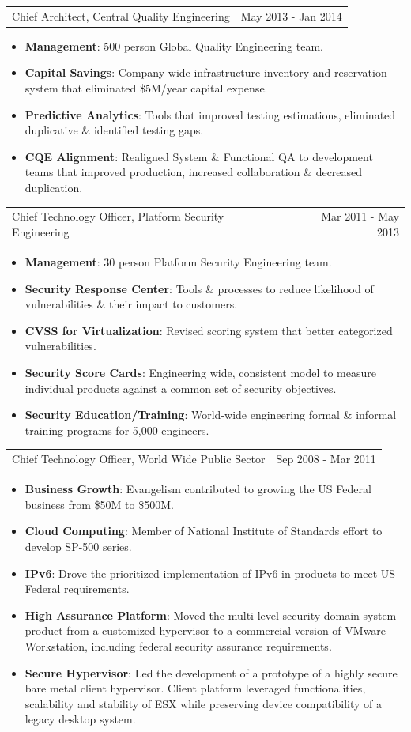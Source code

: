 \documentclass[letterpaper,11pt]{article}
\makeatletter
\newcommand{\resumeCompanyPositionHeading}[2]{
      \item
      \begin{tabular*}{1.0\textwidth}{l@{\extracolsep{\fill}}r}
        {#1} & {#2}
    \end{tabular*}\vspace{-10pt}
}
\newcommand{\resumeItem}[2]{\item{{\textbf{\small#1}}: {\small#2 \vspace{-1pt}}}}
\newcommand{\resumeItemListStart}{\begin{itemize}}
\newcommand{\resumeItemListEnd}{\end{itemize}}\vspace{-10pt}
\makeatother
\begin{document}
          \resumeCompanyPositionHeading
            {Chief Architect, Central Quality Engineering}
            {May 2013 - Jan 2014}
            \resumeItemListStart
                \resumeItem{Management}{500 person Global Quality Engineering team.}
                \resumeItem{Capital Savings}{Company wide infrastructure inventory and reservation system that eliminated \$5M/year capital expense.}
                \resumeItem{Predictive Analytics}{Tools that improved testing estimations, eliminated duplicative \& identified testing gaps.}
                \resumeItem{CQE Alignment}{Realigned System \& Functional QA to development teams that improved production, increased collaboration \& decreased duplication.}
            \resumeItemListEnd

          \resumeCompanyPositionHeading
            {Chief Technology Officer, Platform Security Engineering}
            {Mar 2011 - May 2013}
            \resumeItemListStart
                \resumeItem{Management}{30 person Platform Security Engineering team.}
                \resumeItem{Security Response Center}{Tools \& processes to reduce likelihood of vulnerabilities \& their impact to customers.}
                \resumeItem{CVSS for Virtualization}{Revised scoring system that better categorized vulnerabilities.}
                \resumeItem{Security Score Cards}{Engineering wide, consistent model to measure individual products against a common set of security objectives.}
                \resumeItem{Security Education/Training}{World-wide engineering formal \& informal training programs for 5,000 engineers.}
            \resumeItemListEnd

          \resumeCompanyPositionHeading
            {Chief Technology Officer, World Wide Public Sector}
            {Sep 2008 - Mar 2011}
            \resumeItemListStart
                \resumeItem{Business Growth}{Evangelism contributed to growing the US Federal business from \$50M to \$500M.}
                \resumeItem{Cloud Computing}{Member of National Institute of Standards effort to develop SP-500 series.}
                \resumeItem{IPv6}{Drove the prioritized implementation of IPv6 in products to meet US Federal requirements.}
                \resumeItem{High Assurance Platform}{Moved the multi-level security domain system product from a customized hypervisor to a
                  commercial version of VMware Workstation, including federal security assurance requirements.}
                \resumeItem{Secure Hypervisor}{Led the development of a prototype of a highly secure bare metal client hypervisor. Client platform leveraged
                  functionalities, scalability and stability of ESX while preserving device compatibility of a legacy desktop system.}
            \resumeItemListEnd
\end{document}
